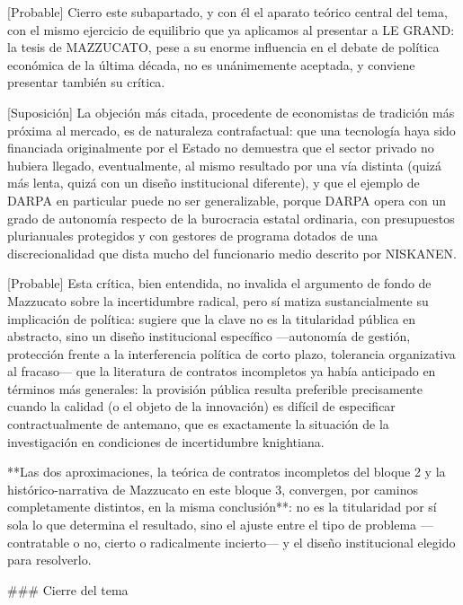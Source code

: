 \documentclass[10pt,a4paper]{article}
\begin{document}
[Probable] Cierro este subapartado, y con él el aparato teórico central del tema, con el mismo ejercicio de equilibrio que ya aplicamos al presentar a LE GRAND: la tesis de MAZZUCATO, pese a su enorme influencia en el debate de política económica de la última década, no es unánimemente aceptada, y conviene presentar también su crítica. 

[Suposición] La objeción más citada, procedente de economistas de tradición más próxima al mercado, es de naturaleza contrafactual: que una tecnología haya sido financiada originalmente por el Estado no demuestra que el sector privado no hubiera llegado, eventualmente, al mismo resultado por una vía distinta (quizá más lenta, quizá con un diseño institucional diferente), y que el ejemplo de DARPA en particular puede no ser generalizable, porque DARPA opera con un grado de autonomía respecto de la burocracia estatal ordinaria, con presupuestos plurianuales protegidos y con gestores de programa dotados de una discrecionalidad que dista mucho del funcionario medio descrito por NISKANEN. 

[Probable] Esta crítica, bien entendida, no invalida el argumento de fondo de Mazzucato sobre la incertidumbre radical, pero sí matiza sustancialmente su implicación de política: sugiere que la clave no es la titularidad pública en abstracto, sino un diseño institucional específico —autonomía de gestión, protección frente a la interferencia política de corto plazo, tolerancia organizativa al fracaso— que la literatura de contratos incompletos ya había anticipado en términos más generales: la provisión pública resulta preferible precisamente cuando la calidad (o el objeto de la innovación) es difícil de especificar contractualmente de antemano, que es exactamente la situación de la investigación en condiciones de incertidumbre knightiana. 

**Las dos aproximaciones, la teórica de contratos incompletos del bloque 2 y la histórico-narrativa de Mazzucato en este bloque 3, convergen, por caminos completamente distintos, en la misma conclusión**: no es la titularidad por sí sola lo que determina el resultado, sino el ajuste entre el tipo de problema —contratable o no, cierto o radicalmente incierto— y el diseño institucional elegido para resolverlo.



### Cierre del tema
\end{document}
